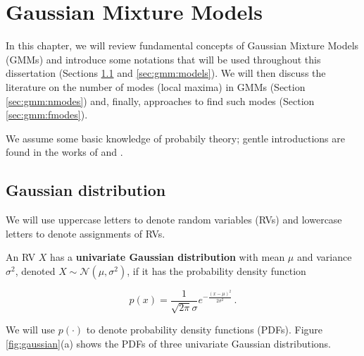 \chapter{Gaussian Mixture Models}
\label{cap:gmm}

In this chapter, we will review fundamental concepts of Gaussian Mixture Models (GMMs) and introduce some notations that will be used throughout this dissertation (Sections \ref{sec:gmm:fundamentals} and \ref{sec:gmm:models}). We will then discuss the literature on the number of modes (local maxima) in GMMs (Section \ref{sec:gmm:nmodes}) and, finally, approaches to find such modes (Section \ref{sec:gmm:fmodes}).

We assume some basic knowledge of probabily theory; gentle introductions are found in the works of \citet{Jaynes2003} and \citet{Kadane2011}.

\section{Gaussian distribution}
\label{sec:gmm:fundamentals}

We will use uppercase letters to denote random variables (RVs) and lowercase letters to denote assignments of RVs.

\begin{definition}
  An RV $X$ has a \textbf{univariate Gaussian distribution} with mean $\mu$ and variance $\sigma^2$, denoted $X \sim \mathcal{N}\left(\mu, \sigma^2\right)$, if it has the probability density function

  \begin{equation}
    p(x) = \frac{1}{\sqrt{2\pi} \sigma} e^{-\frac{(x - \mu)^2}{2\sigma^2}} \, .
  \end{equation}
\end{definition}

\noindent We will use $p( \cdot )$ to denote probability density functions (PDFs). Figure \ref{fig:gaussian}(a) shows the PDFs of three univariate Gaussian distributions.

